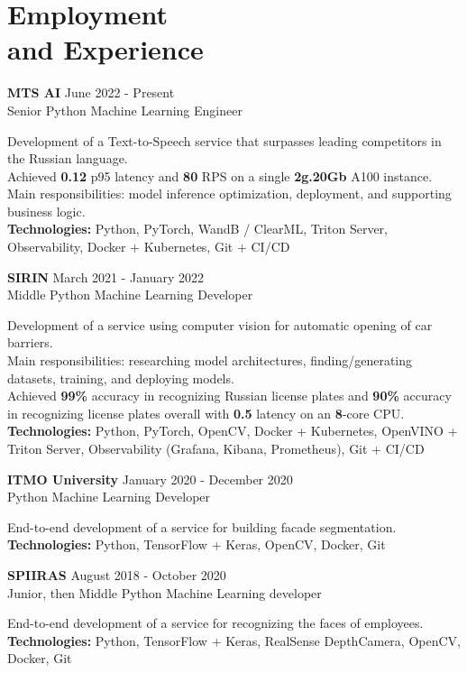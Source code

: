\section{\sc Employment \\and Experience}
\vspace{2.6pt}

\textbf{MTS AI} \hfill June 2022 - Present \\
Senior Python Machine Learning Engineer

Development of a Text-to-Speech service that surpasses leading competitors in the Russian language. \\
Achieved \textbf{0.12} p95 latency and \textbf{80} RPS on a single \textbf{2g.20Gb} A100 instance. \\
Main responsibilities: model inference optimization, deployment, and supporting business logic. \\
\textbf{Technologies:} Python, PyTorch, WandB / ClearML, Triton Server, Observability, Docker + Kubernetes, Git + CI/CD

\textbf{SIRIN} \hfill March 2021 - January 2022 \\
Middle Python Machine Learning Developer

Development of a service using computer vision for automatic opening of car barriers. \\
Main responsibilities: researching model architectures, finding/generating datasets, training, and deploying models. \\
Achieved \textbf{99\%} accuracy in recognizing Russian license plates and \textbf{90\%} accuracy in recognizing license plates overall with \textbf{0.5} latency on an \textbf{8}-core CPU. \\
\textbf{Technologies:} Python, PyTorch, OpenCV, Docker + Kubernetes, OpenVINO + Triton Server, Observability (Grafana, Kibana, Prometheus), Git + CI/CD

\textbf{ITMO University} \hfill January 2020 - December 2020 \\
Python Machine Learning Developer

End-to-end development of a service for building facade segmentation. \\
\textbf{Technologies:} Python, TensorFlow + Keras, OpenCV, Docker, Git

\textbf{SPIIRAS} \hfill August 2018 - October 2020 \\
Junior, then Middle Python Machine Learning developer

End-to-end development of a service for recognizing the faces of employees. \\
\textbf{Technologies:} Python, TensorFlow + Keras, RealSense DepthCamera, OpenCV, Docker, Git

\endinput

